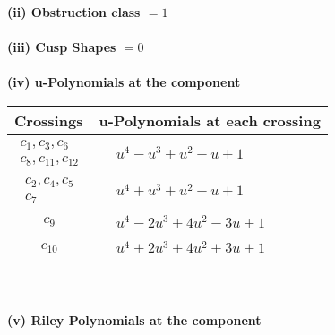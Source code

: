 \documentclass[1p]{elsarticle_modified}
\theoremstyle{definition}
\begin{document}
\flushleft \textbf{(ii) Obstruction class $= 1$}\\~\\
\flushleft \textbf{(iii) Cusp Shapes $= 0$}\\~\\
\newpage\renewcommand{\arraystretch}{1}
\flushleft \textbf{(iv) u-Polynomials at the component}\newline \\
\begin{tabular}{m{50pt}|m{274pt}}
Crossings & \hspace{64pt}u-Polynomials at each crossing \\
\hline $$\begin{aligned}c_{1},c_{3},c_{6}\\c_{8},c_{11},c_{12}\end{aligned}$$&$\begin{aligned}
&u^4- u^3+u^2- u+1
\end{aligned}$\\
\hline $$\begin{aligned}c_{2},c_{4},c_{5}\\c_{7}\end{aligned}$$&$\begin{aligned}
&u^4+u^3+u^2+u+1
\end{aligned}$\\
\hline $$\begin{aligned}c_{9}\end{aligned}$$&$\begin{aligned}
&u^4-2 u^3+4 u^2-3 u+1
\end{aligned}$\\
\hline $$\begin{aligned}c_{10}\end{aligned}$$&$\begin{aligned}
&u^4+2 u^3+4 u^2+3 u+1
\end{aligned}$\\
\hline
\end{tabular}\\~\\
\newpage\renewcommand{\arraystretch}{1}
\flushleft \textbf{(v) Riley Polynomials at the component}\newline \\
\end{document}
